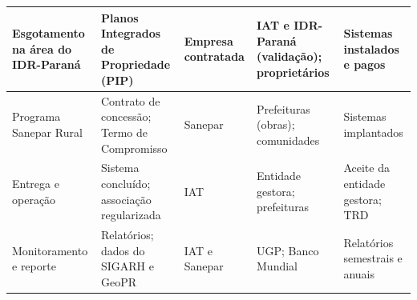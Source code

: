 \begin{landscape}
\begin{quadro}[p]
\begin{tabularx}{\linewidth}{|P{3.6cm}|L|P{3.2cm}|P{3.9cm}|L|}
Esgotamento na área do IDR-Paraná & Planos Integrados de Propriedade (PIP) &
  Empresa contratada & IAT e IDR-Paraná (validação); proprietários & Sistemas instalados e pagos \\ \hline
Programa Sanepar Rural & Contrato de concessão; Termo de Compromisso &
  Sanepar & Prefeituras (obras); comunidades & Sistemas implantados \\ \hline
Entrega e operação & Sistema concluído; associação regularizada &
  IAT & Entidade gestora; prefeituras & Aceite da entidade gestora; TRD \\ \hline
Monitoramento e reporte & Relatórios; dados do SIGARH e GeoPR &
  IAT e Sanepar & UGP; Banco Mundial & Relatórios semestrais e anuais \\ \hline
\end{tabularx}
\end{quadro}
\end{landscape}

